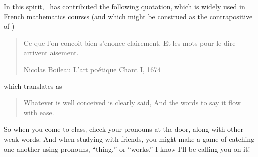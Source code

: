 \begin{para}In this spirit, \hubertdupont\ has contributed the following quotation, which is widely used in French mathematics courses (and which might be construed as the contrapositive  of ) 
%
\begin{quote}
\begin{para}Ce que l'on concoit bien s'enonce clairement,\newline
Et les mots pour le dire arrivent aisement.\end{para}
\begin{flushright}Nicolas Boileau\newline
L'art po\'{e}tique\newline
Chant I, 1674
\end{flushright}
\end{quote}
%
which translates as
%
\begin{quote}
\begin{para}Whatever is well conceived is clearly said,\newline
And the words to say it flow with ease.
\end{para}
\end{quote}
%
\end{para}

\begin{para}So when you come to class, check your pronouns at the door, along with other weak words.  And when studying with friends, you might make a game of catching one another using pronouns, ``thing,'' or ``works.''  I know I'll be calling you on it!\end{para}
